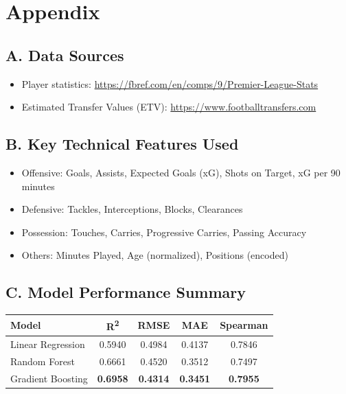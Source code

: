 \documentclass[12pt,a4paper]{article}
\begin{document}
\section*{Appendix}

\subsection*{A. Data Sources}
\begin{itemize}
    \item Player statistics: \url{https://fbref.com/en/comps/9/Premier-League-Stats}
    \item Estimated Transfer Values (ETV): \url{https://www.footballtransfers.com}
\end{itemize}

\subsection*{B. Key Technical Features Used}
\begin{itemize}
    \item Offensive: Goals, Assists, Expected Goals (xG), Shots on Target, xG per 90 minutes
    \item Defensive: Tackles, Interceptions, Blocks, Clearances
    \item Possession: Touches, Carries, Progressive Carries, Passing Accuracy
    \item Others: Minutes Played, Age (normalized), Positions (encoded)
\end{itemize}

\subsection*{C. Model Performance Summary}
\begin{center}
\begin{tabular}{lcccc}
\toprule
\textbf{Model} & \textbf{R\textsuperscript{2}} & \textbf{RMSE} & \textbf{MAE} & \textbf{Spearman} \\
\midrule
Linear Regression & 0.5940 & 0.4984 & 0.4137 & 0.7846 \\
Random Forest     & 0.6661 & 0.4520 & 0.3512 & 0.7497 \\
Gradient Boosting & \textbf{0.6958} & \textbf{0.4314} & \textbf{0.3451} & \textbf{0.7955} \\
\bottomrule
\end{tabular}
\end{center}
\end{document}
